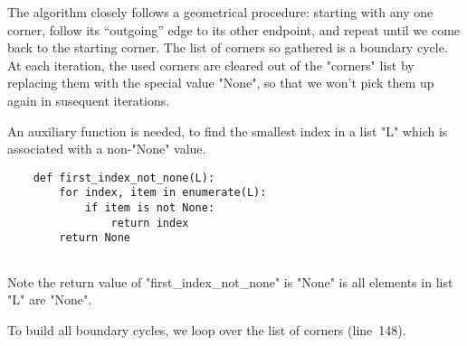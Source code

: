 The algorithm closely follows a geometrical procedure: starting with
any one corner, follow its ``outgoing'' edge to its other endpoint,
and repeat until we come back to the starting corner.  The list of
corners so gathered is a boundary cycle.  At each iteration, the used
corners are cleared out of the "corners" list by replacing them with
the special value "None", so that we won't pick them up again in
susequent iterations.

An auxiliary function is needed, to find the smallest index in a list
"L" which is associated with a non-"None" value. 
\begin{lstlisting}
    def first_index_not_none(L):
        for index, item in enumerate(L):
            if item is not None:
                return index
        return None
    
\end{lstlisting}
Note the return value of "first_index_not_none" is "None" is all
elements in list "L" are "None".

To build all boundary cycles, we loop over the list of corners (line~148).

